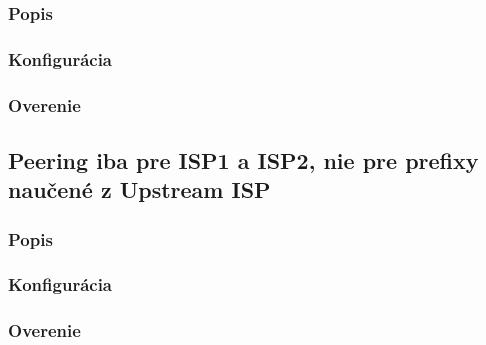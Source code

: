\documentclass[12pt,twoside,a4paper]{report}
\begin{document}
\subsubsection{Popis}
\paragraph{}

\subsubsection{Konfigurácia}
\paragraph{}

\subsubsection{Overenie}
\paragraph{}







\subsection{Peering iba pre ISP1 a ISP2, nie pre prefixy naučené z Upstream ISP}
\subsubsection{Popis}
\paragraph{}

\subsubsection{Konfigurácia}
\paragraph{}

\subsubsection{Overenie}
\paragraph{}
\end{document}
